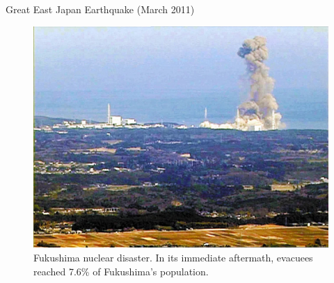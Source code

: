 \documentclass[serif, aspectratio=169]{beamer}
\begin{document}
\begin{frame}{Great East Japan Earthquake (March 2011)}
\begin{minipage}{1.00\textwidth}
\begin{figure}[h!]
\begin{minipage}[t]{0.48\textwidth}
        \caption*{Fukushima nuclear disaster. In its immediate aftermath, evacuees reached 7.6\% of Fukushima's population.}
        \includegraphics[width=\textwidth,height=0.8\textwidth]{Nuclear_explosion.png}
      \end{minipage}

    \end{figure}
    
    \end{minipage}
\end{frame}
\end{document}
